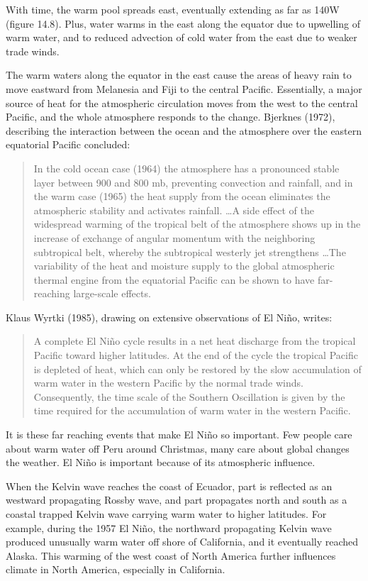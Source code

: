 With time, the warm pool spreads east, eventually extending as far as
140\degrees W (figure 14.8). Plus, water warms in the east along the
equator due to upwelling of warm water, and to reduced advection of
cold water from the east due to weaker trade winds.

The warm waters along the equator in the east cause the areas of heavy
rain to move eastward from Melanesia and Fiji to the central
Pacific. Essentially, a major source of heat for the atmospheric
circulation moves from the west to the central Pacific, and the whole
atmosphere responds to the change. Bjerknes (1972), describing the
interaction between the ocean and the atmosphere over the eastern
equatorial Pacific concluded:
\begin{quote} \small
In the cold ocean case (1964) the atmosphere has a pronounced stable
layer between 900 and 800 mb, preventing convection and
rainfall, and in the warm case (1965)
the heat supply from the ocean eliminates the atmospheric stability
and activates rainfall. \ldots A side effect of the widespread warming
of the tropical belt of the atmosphere shows up in the increase of
exchange of angular momentum with the neighboring subtropical belt,
whereby the subtropical westerly jet strengthens \ldots The
variability of the heat and moisture supply to the global atmospheric
thermal engine from the equatorial Pacific can be shown to have
far-reaching large-scale effects.
\end{quote}
Klaus Wyrtki (1985), drawing on extensive observations of El Ni\~{n}o,
writes:
\begin{quote}\small
A complete El Ni\~{n}o cycle results in a net heat discharge from the
tropical Pacific toward higher latitudes. At the end of the cycle the
tropical Pacific is depleted of heat, which can only be restored by
the slow accumulation of warm water in the western Pacific by the
normal trade winds. Consequently, the time scale of the Southern
Oscillation is given by the time required for the accumulation of warm
water in the western Pacific.
\end{quote}

It is these far reaching events that make El Ni\~{n}o so
important. Few people care about warm water off Peru around Christmas,
many care about global changes the weather. El Ni\~{n}o is important
because of its atmospheric influence.

When the Kelvin wave reaches the coast of Ecuador,
part is reflected as an westward propagating Rossby
wave, and part propagates north and south as a
coastal trapped Kelvin wave carrying warm water to higher
latitudes. For example, during the 1957 El Ni\~{n}o, the northward
propagating Kelvin wave produced unusually warm water off shore of
California, and it eventually reached Alaska. This warming of the west
coast of North America further influences climate in North America,
especially in California.

